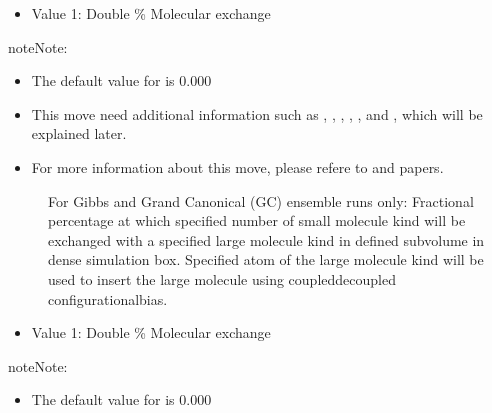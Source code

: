 \documentclass[letterpaper,10pt,english]{sphinxmanual}
\begin{document}
\begin{description}
\begin{description}
\end{description}
\begin{itemize}
\item {} 
Value 1: Double \sphinxhyphen{} \% Molecular exchange

\end{itemize}

\begin{sphinxadmonition}{note}{Note:}\begin{itemize}
\item {} 
The default value for  is 0.000

\item {} 
This move need additional information such as , , , , , and , which will be explained later.

\item {} 
For more information about this move, please refere to  and  papers.

\end{itemize}
\end{sphinxadmonition}
\begin{description}
\item[{}] \leavevmode
For Gibbs and Grand Canonical (GC) ensemble runs only: Fractional percentage at which specified number of small molecule kind will be exchanged with a specified large molecule kind in defined sub\sphinxhyphen{}volume in dense simulation box. Specified atom of the large molecule kind will be used to insert the large molecule using coupled\sphinxhyphen{}decoupled configurational\sphinxhyphen{}bias.

\end{description}
\begin{itemize}
\item {} 
Value 1: Double \sphinxhyphen{} \% Molecular exchange

\end{itemize}

\begin{sphinxadmonition}{note}{Note:}\begin{itemize}
\item {} 
The default value for  is 0.000


\end{itemize}
\end{sphinxadmonition}
\end{description}
\end{document}
